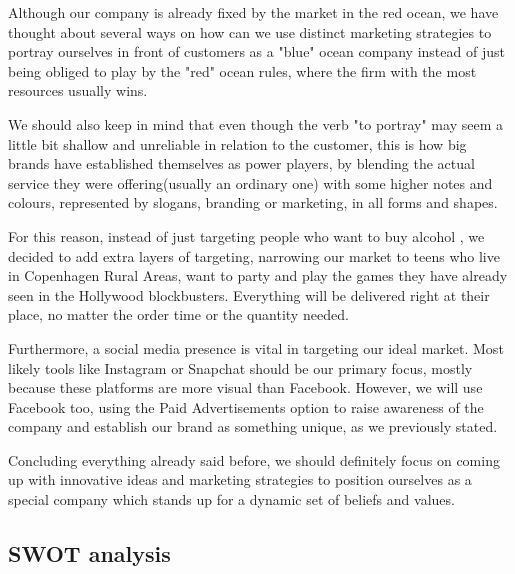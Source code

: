 \documentclass[12p]{article}
\begin{document}
Although our company is already fixed by the market in the red ocean, we have thought about several ways on how can we use distinct marketing strategies to portray ourselves in front of customers as a "blue" ocean company instead of just being obliged to play by the "red" ocean rules, where the firm with the most resources usually wins.

We should also keep in mind that even though the verb "to portray" may seem a little bit shallow and unreliable in relation to the customer, this is how big brands have established themselves as power players, by blending the actual service they were offering(usually an ordinary one) with some higher notes and colours, represented by slogans, branding or marketing, in all forms and shapes.

For this reason, instead of just targeting people who want to buy alcohol , we decided to add extra layers of targeting, narrowing our market to teens who live in Copenhagen Rural Areas, want to party and play the games they have already seen in the Hollywood blockbusters. Everything will be delivered right at their place, no matter the order time or the quantity needed.

Furthermore, a social media presence is vital in targeting our ideal market. Most likely tools like Instagram or Snapchat should be our primary focus, mostly because these platforms are more visual than Facebook. However, we will use Facebook too, using the Paid Advertisements option to raise awareness of the company and establish our brand as something unique, as we previously stated. 

Concluding everything already said before, we should definitely focus on coming up with innovative ideas and marketing strategies to position ourselves as a special company which stands up for a dynamic set of beliefs and values.


\subsection{SWOT analysis} \label{SWOT}
\end{document}
